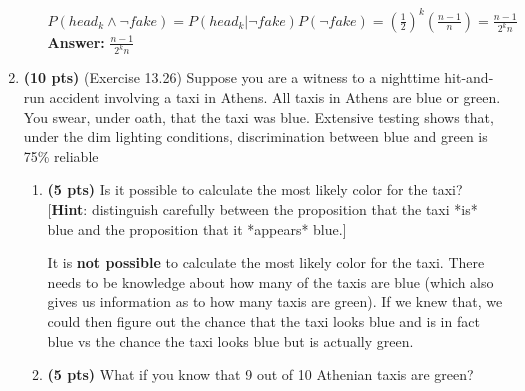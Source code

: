 \documentclass{article}
\begin{document}
\begin{enumerate}
\begin{enumerate}[label=($\alph*$)]
    \color{blue}
        $P(head_k\wedge \neg fake)=P(head_k|\neg fake)P(\neg fake)=(\frac{1}{2})^k(\frac{n-1}{n})=\frac{n-1}{2^kn}$\\
        \textbf{Answer:} $\frac{n-1}{2^kn}$
    \color{black}

    
    \end{enumerate}



\item \textbf{(10 pts)} (Exercise 13.26) Suppose you are a witness to a nighttime hit-and-run accident involving a taxi in Athens. All taxis in Athens are blue or green. You swear, under oath, that the taxi was blue. Extensive testing shows that, under the dim lighting conditions, discrimination between blue and green is 75\% reliable

    \begin{enumerate}[label=($\alph*$)]


    \item \textbf{(5 pts)}  Is it possible to calculate the most likely color for the taxi? [\textbf{Hint}: distinguish carefully between the proposition that the taxi *is* blue and the proposition that it *appears* blue.]

    \color{blue}
        It is \textbf{not possible} to calculate the most likely color for the taxi. There needs to be knowledge about how many of the taxis are blue (which also gives us information as to how many taxis are green). If we knew that, we could then figure out the chance that the taxi looks blue and is in fact blue vs the chance the taxi looks blue but is actually green.
    \color{black}



    \item \textbf{(5 pts)} What if you know that 9 out of 10 Athenian taxis are green?


\end{enumerate}
\end{enumerate}
\end{document}

